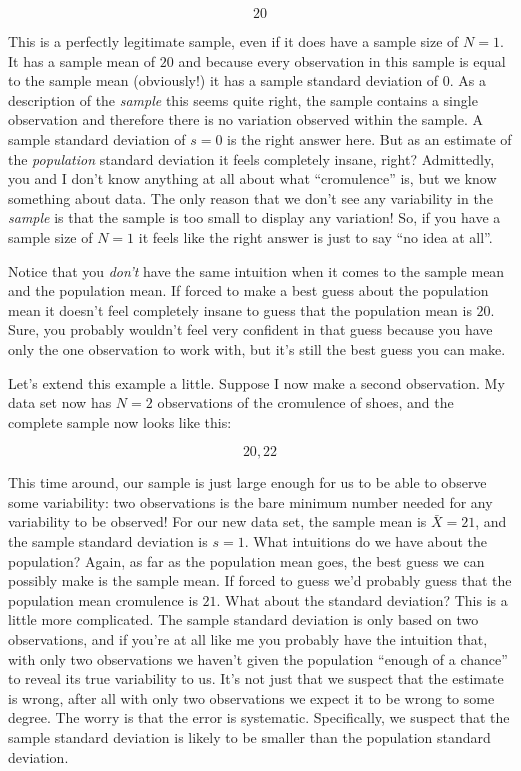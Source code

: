 \documentclass[
  a4paper,
]{book}
\begin{document}
\[20\]

This is a perfectly legitimate sample, even if it does have a sample
size of \(N = 1\). It has a sample mean of \(20\) and because every
observation in this sample is equal to the sample mean (obviously!) it
has a sample standard deviation of \(0\). As a description of the
\emph{sample} this seems quite right, the sample contains a single
observation and therefore there is no variation observed within the
sample. A sample standard deviation of \(s = 0\) is the right answer
here. But as an estimate of the \emph{population} standard deviation it
feels completely insane, right? Admittedly, you and I don't know
anything at all about what ``cromulence'' is, but we know something
about data. The only reason that we don't see any variability in the
\emph{sample} is that the sample is too small to display any variation!
So, if you have a sample size of \(N = 1\) it feels like the right
answer is just to say ``no idea at all''.

Notice that you \emph{don't} have the same intuition when it comes to
the sample mean and the population mean. If forced to make a best guess
about the population mean it doesn't feel completely insane to guess
that the population mean is \(20\). Sure, you probably wouldn't feel
very confident in that guess because you have only the one observation
to work with, but it's still the best guess you can make.

Let's extend this example a little. Suppose I now make a second
observation. My data set now has \(N = 2\) observations of the
cromulence of shoes, and the complete sample now looks like this:

\[20, 22\]

This time around, our sample is just large enough for us to be able to
observe some variability: two observations is the bare minimum number
needed for any variability to be observed! For our new data set, the
sample mean is \(\bar{X} = 21\), and the sample standard deviation is
\(s = 1\). What intuitions do we have about the population? Again, as
far as the population mean goes, the best guess we can possibly make is
the sample mean. If forced to guess we'd probably guess that the
population mean cromulence is \(21\). What about the standard deviation?
This is a little more complicated. The sample standard deviation is only
based on two observations, and if you're at all like me you probably
have the intuition that, with only two observations we haven't given the
population ``enough of a chance'' to reveal its true variability to us.
It's not just that we suspect that the estimate is wrong, after all with
only two observations we expect it to be wrong to some degree. The worry
is that the error is systematic. Specifically, we suspect that the
sample standard deviation is likely to be smaller than the population
standard deviation.
\end{document}
